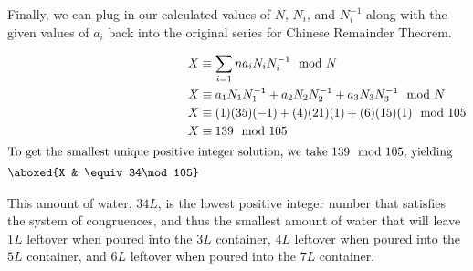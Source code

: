 \documentclass[index]{subfiles}
\begin{document}
Finally, we can plug in our calculated values of \(N\), \(N_i\), and \(N_i^{-1}\) along with the given values of \(a_i\) back into the original series for Chinese Remainder Theorem.

\begin{align*}
    X         & \equiv\sum_{i=1}{n}a_{i}N_{i}N_i^{-1}\mod N               \\
    X         & \equiv a_1N_1N_1^{-1}+a_2N_2N_2^{-1}+a_3N_3N_3^{-1}\mod N \\
    X         & \equiv(1)(35)(-1)+(4)(21)(1)+(6)(15)(1)\mod 105           \\
    X         & \equiv139\mod 105                                         \\
    \intertext{To get the smallest unique positive integer solution, we take \(139\mod105\), yielding}
    \aboxed{X & \equiv34\mod 105}
\end{align*}

This amount of water, \(34L\), is the lowest positive integer number that satisfies the system of congruences, and thus the smallest amount of water that will leave \(1L\) leftover when poured into the \(3L\) container, \(4L\) leftover when poured into the \(5L\) container, and \(6L\) leftover when poured into the \(7L\) container.

\newpage

\raggedright{}
\printbibliography[heading=bibintoc]
\end{document}
